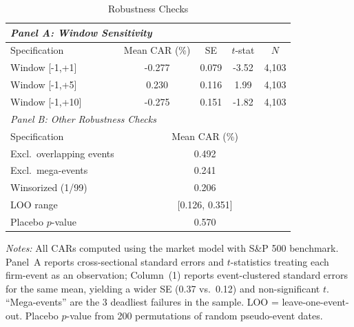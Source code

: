 \begin{table}[htbp]
\centering
\caption{Robustness Checks}
\label{tab:robustness}
\begin{threeparttable}
\begin{tabular}{lcccc}
\toprule
\multicolumn{5}{l}{\textit{Panel A: Window Sensitivity}} \\
\midrule
Specification & Mean CAR (\%) & SE & $t$-stat & $N$ \\
\midrule
Window [-1,+1] & -0.277 & 0.079 & -3.52 & 4,103 \\
Window [-1,+5] & 0.230 & 0.116 & 1.99 & 4,103 \\
Window [-1,+10] & -0.275 & 0.151 & -1.82 & 4,103 \\
\midrule
\multicolumn{5}{l}{\textit{Panel B: Other Robustness Checks}} \\
\midrule
Specification & \multicolumn{4}{c}{Mean CAR (\%)} \\
\midrule
Excl.\ overlapping events & \multicolumn{4}{c}{0.492} \\
Excl.\ mega-events & \multicolumn{4}{c}{0.241} \\
Winsorized (1/99) & \multicolumn{4}{c}{0.206} \\
LOO range & \multicolumn{4}{c}{[0.126, 0.351]} \\
Placebo $p$-value & \multicolumn{4}{c}{0.570} \\
\bottomrule
\end{tabular}
\begin{tablenotes}[flushleft]
\small
\item \textit{Notes:} All CARs computed using the market model with S\&P 500 benchmark.
Panel~A reports cross-sectional standard errors and $t$-statistics treating each firm-event as an observation;  Column~(1) reports event-clustered standard errors for the same mean, yielding a wider SE (0.37 vs.\ 0.12) and non-significant $t$.
``Mega-events'' are the 3 deadliest failures in the sample. LOO = leave-one-event-out.
Placebo $p$-value from 200 permutations of random pseudo-event dates.
\end{tablenotes}
\end{threeparttable}
\end{table}

